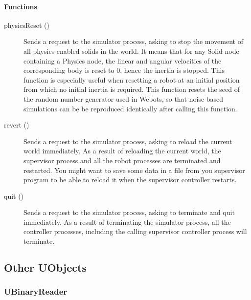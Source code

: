 \paragraph{Functions}
\label{webots.uobjects.supervisor.simulationcontroller.functions}%

\noindent
\begin{description}
\item[{physicsReset ()}]          Sends a request to the simulator process, asking to stop the
          movement of all physics enabled solids in the world. It means
          that for any Solid node containing a Physics node, the linear
          and angular velocities of the corresponding body is reset to 0,
          hence the inertia is stopped. This function is especially useful
          when resetting a robot at an initial position from which no
          initial inertia is required.
          This function resets the seed of the random number generator
          used in Webots, so that noise based simulations can be be
          reproduced identically after calling this function.

\item[{revert ()}]        Sends a request to the simulator process, asking to reload the
          current world immediately. As a result of reloading the current
          world, the supervisor process and all the robot processes are
          terminated and restarted. You might want to save some data in a
          file from you supervisor program to be able to reload it when
          the supervisor controller restarts.

\item[{quit ()}]          Sends a request to the simulator process, asking
          to terminate and quit immediately. As a result of terminating
          the simulator process, all the controller processes, including
          the calling supervisor controller process will terminate.

\end{description}

\subsection{Other UObjects}
\label{webots.uobjects.other}%

\subsubsection{UBinaryReader}
\label{webots.uobjects.other.ubinaryreader}%

